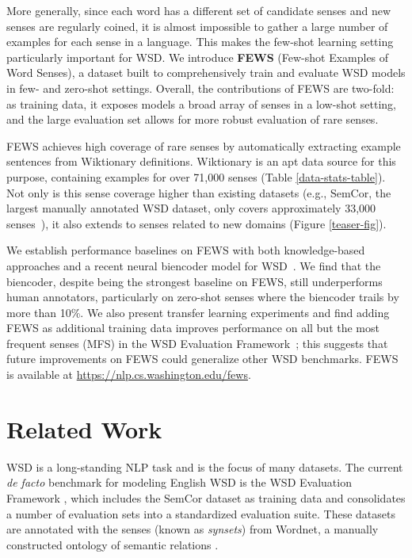 \documentclass[11pt,a4paper]{article}
\begin{document}
More generally, since each word has a different set of candidate senses and new senses are regularly coined, it is almost impossible to gather a large number of examples for each sense in a language. This makes the few-shot learning setting particularly important for WSD. We introduce \textbf{FEWS} (Few-shot Examples of Word Senses), a dataset built to comprehensively train and evaluate WSD models in few- and zero-shot settings. Overall, the contributions of FEWS are two-fold: as training data, it exposes models a broad array of senses in a low-shot setting, and the large evaluation set allows for more robust evaluation of rare senses.

FEWS achieves high coverage of rare senses by automatically extracting example sentences from Wiktionary definitions. Wiktionary is an apt data source for this purpose, containing examples for over 71,000 senses (Table \ref{data-stats-table}). Not only is this sense coverage higher than existing datasets (e.g., SemCor, the largest manually annotated WSD dataset, only covers approximately 33,000 senses~\cite{miller1993semantic}), it also extends to senses related to new domains (Figure \ref{teaser-fig}). 

We establish performance baselines on FEWS with both knowledge-based approaches and a recent neural biencoder model for WSD~\cite{blevins2020moving}. We find that the biencoder, despite being the strongest baseline on FEWS, still underperforms human annotators, particularly on zero-shot senses where the biencoder trails by more than 10\%. We also present transfer learning experiments and find adding FEWS as additional training data improves performance on all but the most frequent senses (MFS) in the WSD Evaluation Framework~\cite{raganato2017word}; this suggests that future improvements on FEWS could generalize other WSD benchmarks. FEWS is available at \url{https://nlp.cs.washington.edu/fews}.

\section{Related Work}

WSD is a long-standing NLP task and is the focus of many datasets. The current \textit{de facto} benchmark for modeling English WSD is the WSD Evaluation Framework \cite{raganato2017word}, which includes the SemCor dataset \cite{miller1993semantic} as training data and consolidates a number of evaluation sets \cite{pradhan2007semeval, palmer2001english, snyder2004english, navigli2013semeval, moro2015semeval} into a standardized evaluation suite. These datasets are annotated with the senses (known as \textit{synsets}) from Wordnet, a manually constructed ontology of semantic relations \cite{miller1993semantic}. 
\end{document}
